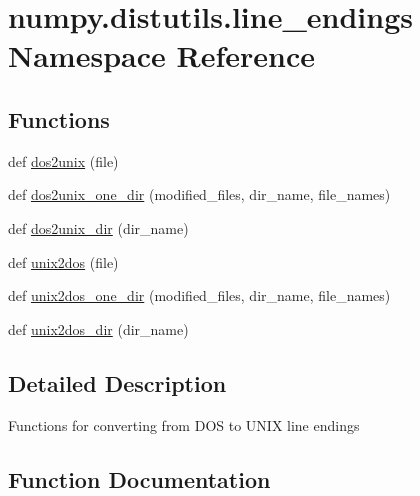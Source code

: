 \hypertarget{namespacenumpy_1_1distutils_1_1line__endings}{}\section{numpy.\+distutils.\+line\+\_\+endings Namespace Reference}
\label{namespacenumpy_1_1distutils_1_1line__endings}
\subsection*{Functions}
\begin{DoxyCompactItemize}
\item 
def \hyperlink{namespacenumpy_1_1distutils_1_1line__endings_aaf57d2286b7b131eb6795d593fb4aa65}{dos2unix} (file)
\item 
def \hyperlink{namespacenumpy_1_1distutils_1_1line__endings_a9817e7931c69bee6f3dcf40bbdde1755}{dos2unix\+\_\+one\+\_\+dir} (modified\+\_\+files, dir\+\_\+name, file\+\_\+names)
\item 
def \hyperlink{namespacenumpy_1_1distutils_1_1line__endings_af4f271d4d777cd28fd66349d9995746a}{dos2unix\+\_\+dir} (dir\+\_\+name)
\item 
def \hyperlink{namespacenumpy_1_1distutils_1_1line__endings_ab219608baeab5cb4977a3cfdf5e18f11}{unix2dos} (file)
\item 
def \hyperlink{namespacenumpy_1_1distutils_1_1line__endings_ae5749892b6a246108e94200952317461}{unix2dos\+\_\+one\+\_\+dir} (modified\+\_\+files, dir\+\_\+name, file\+\_\+names)
\item 
def \hyperlink{namespacenumpy_1_1distutils_1_1line__endings_a977976ae0886e5c126cf58e81a568201}{unix2dos\+\_\+dir} (dir\+\_\+name)
\end{DoxyCompactItemize}


\subsection{Detailed Description}
\begin{DoxyVerb}Functions for converting from DOS to UNIX line endings\end{DoxyVerb}
 

\subsection{Function Documentation}
\mbox{\label{namespacenumpy_1_1distutils_1_1line__endings_aaf57d2286b7b131eb6795d593fb4aa65}} 
